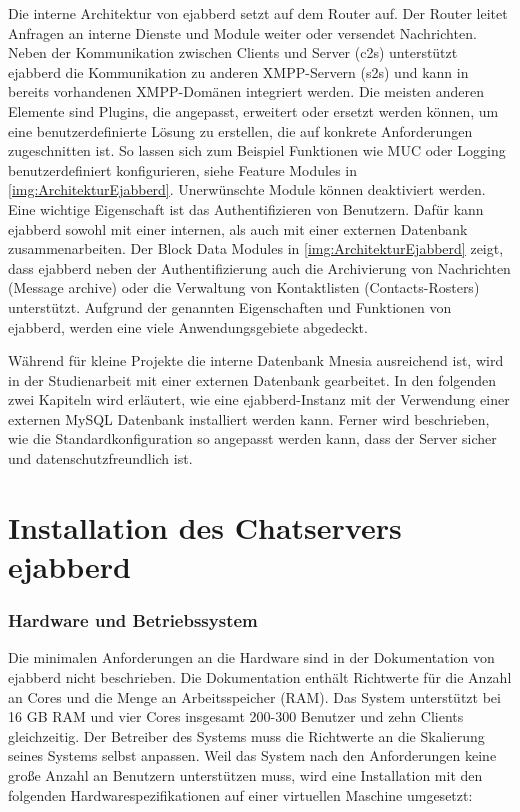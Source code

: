 \documentclass[a4paper,titlepage,halfparskip,12pt]{scrreprt}
\begin{document}
\begin{onehalfspacing}
Die interne Architektur von ejabberd setzt auf dem Router auf. Der Router leitet Anfragen an interne Dienste und Module weiter oder versendet Nachrichten. Neben der Kommunikation zwischen Clients und Server (c2s) unterstützt ejabberd die Kommunikation zu anderen \ac{XMPP}-Servern (s2s) und kann in bereits vorhandenen \ac{XMPP}-Domänen integriert werden. Die meisten anderen Elemente sind Plugins, die angepasst, erweitert oder ersetzt werden können, um eine benutzerdefinierte Lösung zu erstellen, die auf konkrete Anforderungen zugeschnitten ist. So lassen sich zum Beispiel Funktionen wie \ac{MUC} oder Logging benutzerdefiniert konfigurieren, siehe Feature Modules in \autoref{img:ArchitekturEjabberd}. Unerwünschte Module können deaktiviert werden. Eine wichtige Eigenschaft ist das Authentifizieren von Benutzern. Dafür kann ejabberd sowohl mit einer internen, als auch mit einer externen Datenbank zusammenarbeiten. Der Block Data Modules in \autoref{img:ArchitekturEjabberd} zeigt, dass ejabberd neben der Authentifizierung auch die Archivierung von Nachrichten (Message archive) oder die Verwaltung von Kontaktlisten (Contacts-Rosters) unterstützt. Aufgrund der genannten Eigenschaften und Funktionen von ejabberd, werden eine viele Anwendungsgebiete abgedeckt.\cite{ejabberdModulesDeployment, ejabberdDoc}

Während für kleine Projekte die interne Datenbank Mnesia ausreichend ist, wird in der Studienarbeit mit einer externen Datenbank gearbeitet. In den folgenden zwei Kapiteln wird erläutert, wie eine ejabberd-Instanz mit der Verwendung einer externen MySQL Datenbank installiert werden kann. Ferner wird beschrieben, wie die Standardkonfiguration so angepasst werden kann, dass der Server sicher und datenschutzfreundlich ist.

\pagebreak

\section{Installation des Chatservers ejabberd}
\label{sec:InstallationEjabberd}

\subsubsection*{Hardware und Betriebssystem}

Die minimalen Anforderungen an die Hardware sind in der Dokumentation von ejabberd \cite{ejabberdDocGettingStarted} nicht beschrieben. Die Dokumentation enthält Richtwerte für die Anzahl an Cores und die Menge an Arbeitsspeicher (RAM). Das System unterstützt bei 16 GB RAM und vier Cores insgesamt 200-300 Benutzer und zehn Clients gleichzeitig. Der Betreiber des Systems muss die Richtwerte an die Skalierung seines Systems selbst anpassen. Weil das System nach den Anforderungen keine große Anzahl an Benutzern unterstützen muss, wird eine Installation mit den folgenden Hardwarespezifikationen auf einer virtuellen Maschine umgesetzt:


\end{onehalfspacing}
\end{document}
